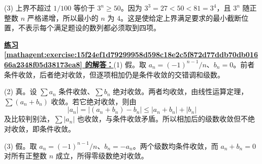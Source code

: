 \documentclass[UTF8,fontset=fandol,11pt]{ctexart}
\begin{document}
(3) 上界不超过 $1/100$ 等价于 $3^n\geq50$。因为 $3^3=27<50<81=3^4$，且 $3^n$ 随正整数 $n$ 严格递增，所以最小的 $n$ 为 $4$。这是使给定上界满足要求的最小截断位置，不表示每个满足题设的数列都必须取到四项。\par
\par\noindent\textbf{\hyperref[mathagent:exercise:15f24ef1d79299958d598c18e2c5f872d77ddb70db01666a2348f05d38173ea8]{练习 \ref*{mathagent:exercise:15f24ef1d79299958d598c18e2c5f872d77ddb70db01666a2348f05d38173ea8} 的解答：}}(1) 假。取 $a_n=(-1)^{n-1}/n$、$b_n=0$。前者条件收敛，后者绝对收敛，但逐项相加仍是条件收敛的交错调和级数。

(2) 真。设 $\sum a_n$ 条件收敛、$\sum b_n$ 绝对收敛。两者均收敛，由线性运算定理，$\sum(a_n+b_n)$ 收敛。若它绝对收敛，则由
\[
|a_n|=|(a_n+b_n)-b_n|\leq|a_n+b_n|+|b_n|
\]
及比较判别法，$\sum |a_n|$ 也收敛，与条件收敛矛盾。所以相加后的级数收敛但不绝对收敛，即条件收敛。

(3) 假。取 $a_n=(-1)^{n-1}/n$、$b_n=-a_n$。两个级数均条件收敛，而 $a_n+b_n=0$ 对所有正整数 $n$ 成立，所得零级数绝对收敛。\par
\end{document}
